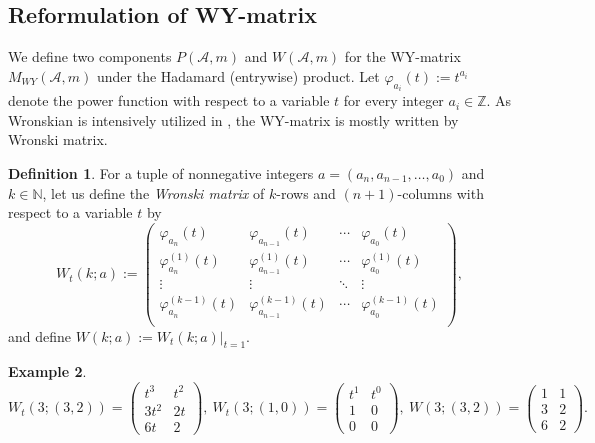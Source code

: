 \documentclass[12pt]{amsart}
\theoremstyle{definition}
\newtheorem{definition}{Definition}[section]
\newtheorem{example}[definition]{Example}
\newcommand{\NN}{\mathbb{N}}
\newcommand{\ZZ}{\mathbb{Z}}
\newcommand{\AAA}{\mathcal{A}}
\begin{document}

\subsection{Reformulation of WY-matrix }\label{subsection:component_F}
We define two components $P(\AAA,m)$ and $W(\AAA,m)$ 
for the WY-matrix $M_{WY}(\AAA,m)$ under the Hadamard (entrywise) product. 
%
Let %
$\varphi_{a_i}(t):=t^{a_i}$ denote 
the power function with respect to a variable $t$ 
for every %
integer $a_i\in \ZZ$. 
%
As Wronskian is intensively utilized in \cite{Wakefield-Yuzvinsky}, 
the WY-matrix is mostly written by Wronski matrix. 

\begin{definition} %
    For a tuple of nonnegative integers $a=(a_n,a_{n-1},\ldots,a_0)$ and $k\in\NN$, 
    let us define the \emph{Wronski matrix} of $k$-rows and $(n+1)$-columns 
    with respect to a variable $t$ by 
\[
W_t(k;a):=%
\left(
\begin{array}{cccc}
 \varphi_{a_n}(t) & \varphi_{a_{n-1}}(t) & \cdots & \varphi_{a_{0}}(t) \\
 \varphi_{a_n}^{(1)}(t) & \varphi_{a_{n-1}}^{(1)}(t) & \cdots & \varphi_{a_{0}}^{(1)}(t) \\
 \vdots & \vdots & \ddots & \vdots \\
 \varphi_{a_n}^{(k-1)}(t) & \varphi_{a_{n-1}}^{(k-1)}(t) & \cdots & \varphi_{a_{0}}^{(k-1)}(t) \\\end{array}
\right),
\]
and define $W(k;a):=W_{t}(k;a)|_{t=1}$. 
\end{definition}

\begin{example}
\[
W_t(3;(3,2))=
\left(
\begin{array}{cc}
 t^3 & t^2 \\
 3t^2 & 2t \\
 6t & 2 
\end{array}
\right),\ 
W_t(3;(1,0))=
\left(
\begin{array}{cc}
 t^1 & t^0 \\
 1 & 0 \\
 0 & 0 
\end{array}
\right),\ 
W(3;(3,2))=
\left(
\begin{array}{cc}
 1 & 1 \\
 3 & 2 \\
 6 & 2 
\end{array}
\right).
\]
\end{example}
\end{document}
